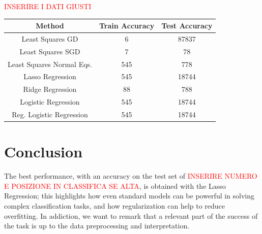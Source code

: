 \documentclass[10pt,conference,compsocconf]{IEEEtran}
\begin{document}
\textcolor{red}{INSERIRE I DATI GIUSTI}
\begin{center}
\label{table1}
\begin{tabular}{|c c c|} 
 \hline
 Method & Train Accuracy & Test Accuracy  \\ [0.5ex] 
 \hline\hline
 Least Squares GD & 6 & 87837  \\ 
 \hline
 Least Squares SGD & 7 & 78 \\
 \hline
 Least Squares Normal Eqs. & 545 & 778  \\
 \hline
 Lasso Regression & 545 & 18744  \\
 \hline
 Ridge Regression & 88 & 788  \\ 
 \hline
 Logistic Regression & 545 & 18744  \\
 \hline
 Reg. Logistic Regression & 545 & 18744  \\
 \hline
\end{tabular}
\end{center}



\section{Conclusion}

The best performance, with an accuracy on the test set of \textcolor{red}{INSERIRE NUMERO E POSIZIONE IN CLASSIFICA SE ALTA}, is obtained with the Lasso Regression; this highlights how even standard models can be powerful in solving complex classification tasks, and how regularization can help to reduce overfitting.
In addiction, we want to remark that a relevant part of the success of the task is up to the data preprocessing and interpretation.
\end{document}
